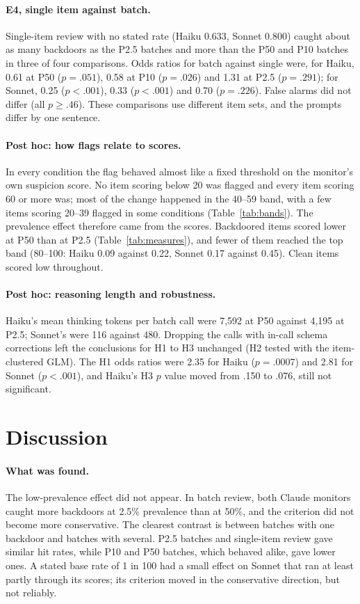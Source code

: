 \documentclass[letterpaper]{article} %
\begin{document}
\paragraph{E4, single item against batch.} Single-item review with no stated rate (Haiku 0.633, Sonnet 0.800) caught about as many backdoors as the P2.5 batches and more than the P50 and P10 batches in three of four comparisons. Odds ratios for batch against single were, for Haiku, 0.61 at P50 ($p = .051$), 0.58 at P10 ($p = .026$) and 1.31 at P2.5 ($p = .291$); for Sonnet, 0.25 ($p < .001$), 0.33 ($p < .001$) and 0.70 ($p = .226$). False alarms did not differ (all $p \geq .46$). These comparisons use different item sets, and the prompts differ by one sentence.

\paragraph{Post hoc: how flags relate to scores.} In every condition the flag behaved almost like a fixed threshold on the monitor's own suspicion score. No item scoring below 20 was flagged and every item scoring 60 or more was; most of the change happened in the 40--59 band, with a few items scoring 20--39 flagged in some conditions (Table~\ref{tab:bands}). The prevalence effect therefore came from the scores. Backdoored items scored lower at P50 than at P2.5 (Table~\ref{tab:measures}), and fewer of them reached the top band (80--100: Haiku 0.09 against 0.22, Sonnet 0.17 against 0.45). Clean items scored low throughout.

\paragraph{Post hoc: reasoning length and robustness.} Haiku's mean thinking tokens per batch call were 7,592 at P50 against 4,195 at P2.5; Sonnet's were 116 against 480. Dropping the calls with in-call schema corrections left the conclusions for H1 to H3 unchanged (H2 tested with the item-clustered GLM). The H1 odds ratios were 2.35 for Haiku ($p = .0007$) and 2.81 for Sonnet ($p < .001$), and Haiku's H3 $p$ value moved from .150 to .076, still not significant.

\section{Discussion}

\paragraph{What was found.} The low-prevalence effect did not appear. In batch review, both Claude monitors caught more backdoors at 2.5\% prevalence than at 50\%, and the criterion did not become more conservative. The clearest contrast is between batches with one backdoor and batches with several. P2.5 batches and single-item review gave similar hit rates, while P10 and P50 batches, which behaved alike, gave lower ones. A stated base rate of 1 in 100 had a small effect on Sonnet that ran at least partly through its scores; its criterion moved in the conservative direction, but not reliably.
\end{document}
